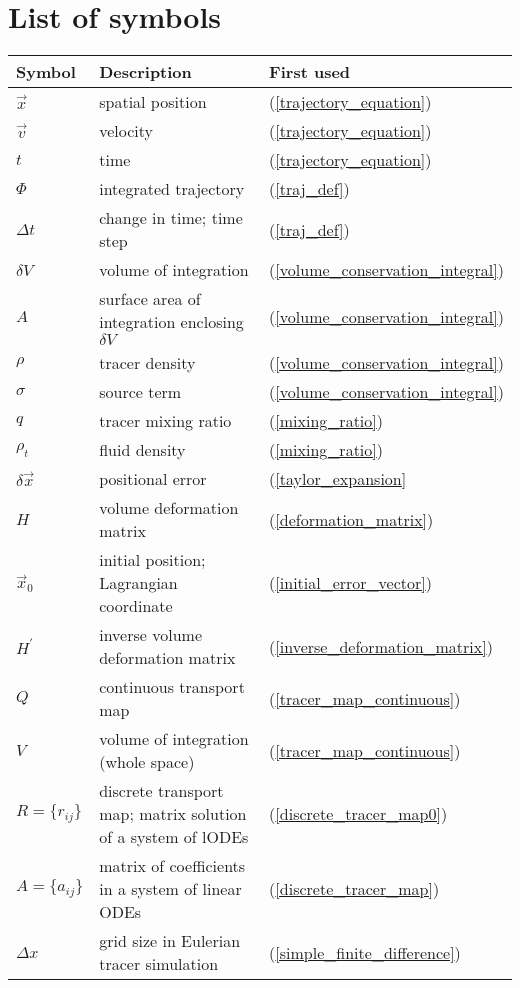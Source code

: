 
\section*{List of symbols}


\begin{tabular}{lll}
	Symbol & Description & First used \\ \hline
	$\vec x$ & spatial position & (\ref{trajectory_equation})\\
	$\vec v$ & velocity & (\ref{trajectory_equation})\\
	$t$ & time & (\ref{trajectory_equation})\\
	$\Phi$ & integrated trajectory & (\ref{traj_def}) \\
	$\Delta t$ & change in time; time step & (\ref{traj_def}) \\
	$\delta V$ & volume of integration & (\ref{volume_conservation_integral})\\
	$A$ & surface area of integration enclosing $\delta V$ & (\ref{volume_conservation_integral})\\
	$\rho$ & tracer density & (\ref{volume_conservation_integral})\\
	$\sigma$ & source term & (\ref{volume_conservation_integral})\\
	$q$ & tracer mixing ratio & (\ref{mixing_ratio})\\
	$\rho_t$ & fluid density & (\ref{mixing_ratio})\\
	$\delta \vec x$ & positional error & (\ref{taylor_expansion}\\
	$H$ & volume deformation matrix & (\ref{deformation_matrix})\\
	$\vec x_0$ & initial position; Lagrangian coordinate & (\ref{initial_error_vector})\\
	$H^\prime$ & inverse volume deformation matrix & (\ref{inverse_deformation_matrix})\\
	$Q$ & continuous transport map & (\ref{tracer_map_continuous}) \\
	$V$ & volume of integration (whole space) & (\ref{tracer_map_continuous}) \\
	$R=\lbrace r_{ij} \rbrace$ & discrete transport map; matrix solution of a system of lODEs & (\ref{discrete_tracer_map0}) \\
	$A=\lbrace a_{ij} \rbrace$ & matrix of coefficients in a system of linear ODEs & (\ref{discrete_tracer_map}) \\
	$\Delta x$ & grid size in Eulerian tracer simulation & (\ref{simple_finite_difference}) \\

\end{tabular}
